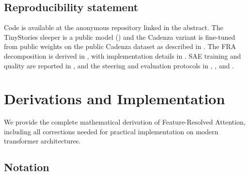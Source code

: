 \documentclass{article} %
\theoremstyle{plain}
\theoremstyle{definition}
\theoremstyle{remark}
\begin{document}
\subsection*{Reproducibility statement}
Code is available at the anonymous repository linked in the abstract. The TinyStories sleeper is a public model () and the Cadenza variant is fine-tuned from public weights on the public Cadenza dataset as described in . The FRA decomposition is derived in , with implementation details in . SAE training and quality are reported in , and the steering and evaluation protocols in , , and .






\appendix


\section{Derivations and Implementation}
\label{app:derivations}

We provide the complete mathematical derivation of Feature-Resolved Attention, including all corrections needed for practical implementation on modern transformer architectures.

\subsection{Notation}
\end{document}
